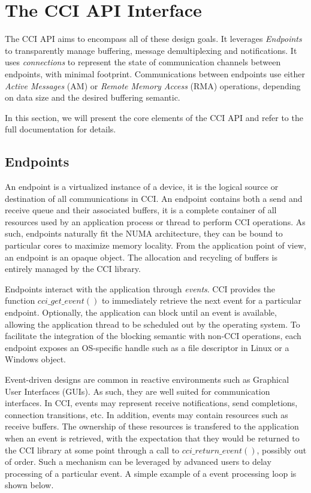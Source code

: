 \section{The CCI API Interface}
\label{sec:interface}

The CCI API aims to encompass all of these design goals. It leverages \emph{Endpoints} to transparently manage buffering, message demultiplexing and notifications. It uses \emph{connections} to represent the state of communication channels between endpoints, with minimal footprint. Communications between endpoints use either \emph{Active Messages} (AM) or \emph{Remote Memory Access} (RMA) operations, depending on data size and the desired buffering semantic. 

In this section, we will present the core elements of the CCI API and refer to the full documentation\cite{cci-api} for details.

\subsection{Endpoints}
An endpoint is a virtualized instance of a device, it is the logical source 
or destination of all communications in CCI. An endpoint contains both a send 
and receive queue and their associated buffers, it is a complete container 
of all resources used by an application process or thread to perform CCI 
operations. As such, endpoints naturally fit the NUMA architecture, they can 
be bound to particular cores to maximize memory locality. From the application 
point of view, an endpoint is an opaque object. The allocation and recycling 
of buffers is entirely managed by the CCI library.

Endpoints interact with the application through \emph{events}. CCI provides the function $cci\_get\_event()$ to immediately retrieve the next event for a particular endpoint. Optionally, the application can block until an event is available, allowing the application thread to be scheduled out by the operating system. To facilitate the integration of the blocking semantic with non-CCI operations, each endpoint exposes an OS-specific handle such as a file descriptor in Linux or a Windows object. 

Event-driven designs are common in reactive environments such as Graphical User  Interfaces (GUIs). As such, they are well suited for communication interfaces. In CCI, events may represent receive notifications, send completions, connection transitions, etc. In addition, events may contain resources such as receive buffers. The ownership of these resources is transfered to the application when an event is retrieved, with the expectation that they would be returned to the CCI library at some point through a call to $cci\_return\_event()$, possibly out of order. Such a mechanism can be leveraged by advanced users to delay processing of a particular event. A simple example of a event processing loop is shown below.

